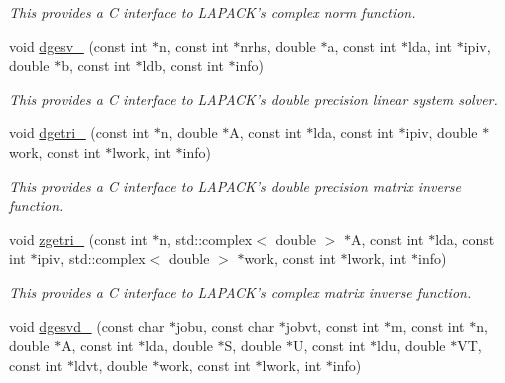 \begin{DoxyCompactItemize}
\begin{DoxyCompactList}\small\item\em This provides a C interface to L\-A\-P\-A\-C\-K's complex norm function. \end{DoxyCompactList}\item 
\hypertarget{namespacekeycpp_a12719f4b48de048f9642066666a920bd}{void \hyperlink{namespacekeycpp_a12719f4b48de048f9642066666a920bd}{dgesv\-\_\-} (const int $\ast$n, const int $\ast$nrhs, double $\ast$a, const int $\ast$lda, int $\ast$ipiv, double $\ast$b, const int $\ast$ldb, const int $\ast$info)}\label{namespacekeycpp_a12719f4b48de048f9642066666a920bd}

\begin{DoxyCompactList}\small\item\em This provides a C interface to L\-A\-P\-A\-C\-K's double precision linear system solver. \end{DoxyCompactList}\item 
\hypertarget{namespacekeycpp_af92d0d887ae48cc4222f7167232a7f82}{void \hyperlink{namespacekeycpp_af92d0d887ae48cc4222f7167232a7f82}{dgetri\-\_\-} (const int $\ast$n, double $\ast$A, const int $\ast$lda, const int $\ast$ipiv, double $\ast$work, const int $\ast$lwork, int $\ast$info)}\label{namespacekeycpp_af92d0d887ae48cc4222f7167232a7f82}

\begin{DoxyCompactList}\small\item\em This provides a C interface to L\-A\-P\-A\-C\-K's double precision matrix inverse function. \end{DoxyCompactList}\item 
\hypertarget{namespacekeycpp_a4190e125fe33133aafa586089ca6e174}{void \hyperlink{namespacekeycpp_a4190e125fe33133aafa586089ca6e174}{zgetri\-\_\-} (const int $\ast$n, std\-::complex$<$ double $>$ $\ast$A, const int $\ast$lda, const int $\ast$ipiv, std\-::complex$<$ double $>$ $\ast$work, const int $\ast$lwork, int $\ast$info)}\label{namespacekeycpp_a4190e125fe33133aafa586089ca6e174}

\begin{DoxyCompactList}\small\item\em This provides a C interface to L\-A\-P\-A\-C\-K's complex matrix inverse function. \end{DoxyCompactList}\item 
\hypertarget{namespacekeycpp_a8fe7a71afbb6c5dc049cdd7afff6c0af}{void \hyperlink{namespacekeycpp_a8fe7a71afbb6c5dc049cdd7afff6c0af}{dgesvd\-\_\-} (const char $\ast$jobu, const char $\ast$jobvt, const int $\ast$m, const int $\ast$n, double $\ast$A, const int $\ast$lda, double $\ast$S, double $\ast$U, const int $\ast$ldu, double $\ast$V\-T, const int $\ast$ldvt, double $\ast$work, const int $\ast$lwork, int $\ast$info)}\label{namespacekeycpp_a8fe7a71afbb6c5dc049cdd7afff6c0af}


\end{DoxyCompactItemize}
